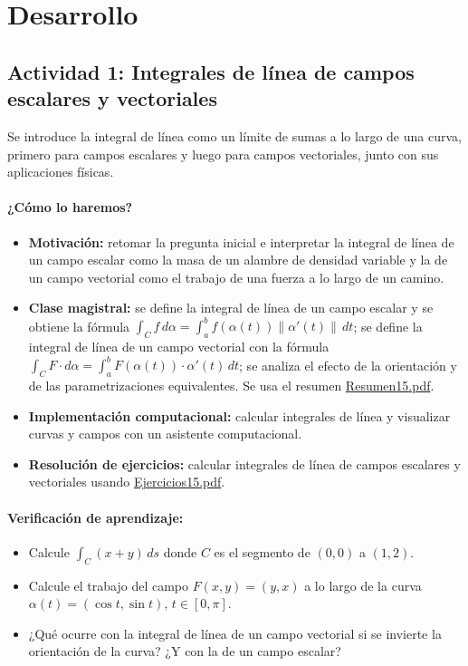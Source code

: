 \documentclass[a4,11pt]{aleph-notas}
\begin{document}
\section*{Desarrollo}

\subsection*{Actividad 1: Integrales de línea de campos escalares y vectoriales}
Se introduce la integral de línea como un límite de sumas a lo largo de una curva, primero para campos escalares y luego para campos vectoriales, junto con sus aplicaciones físicas.

\paragraph{¿Cómo lo haremos?}
\begin{itemize}[leftmargin=*]
    \item \textbf{Motivación:} retomar la pregunta inicial e interpretar la integral de línea de un campo escalar como la masa de un alambre de densidad variable y la de un campo vectorial como el trabajo de una fuerza a lo largo de un camino.
    \item \textbf{Clase magistral:} se define la integral de línea de un campo escalar y se obtiene la fórmula $\int_C f\,d\alpha=\int_a^b f(\alpha(t))\|\alpha'(t)\|\,dt$; se define la integral de línea de un campo vectorial con la fórmula $\int_C F\cdot d\alpha=\int_a^b F(\alpha(t))\cdot\alpha'(t)\,dt$; se analiza el efecto de la orientación y de las parametrizaciones equivalentes. Se usa el resumen \href{https://andres-merino.github.io/MatematicaIII-05-N0051/01Resumen/Resumen15.pdf}{Resumen15.pdf}.
    \item \textbf{Implementación computacional:} calcular integrales de línea y visualizar curvas y campos con un asistente computacional.
    \item \textbf{Resolución de ejercicios:} calcular integrales de línea de campos escalares y vectoriales usando \href{https://andres-merino.github.io/MatematicaIII-05-N0051/04Ejercicios/Ejercicios15.pdf}{Ejercicios15.pdf}.
\end{itemize}

\paragraph{Verificación de aprendizaje:}
\begin{itemize}[leftmargin=*]
    \item Calcule $\int_C (x+y)\,ds$ donde $C$ es el segmento de $(0,0)$ a $(1,2)$.
    \item Calcule el trabajo del campo $F(x,y)=(y,x)$ a lo largo de la curva $\alpha(t)=(\cos t,\sin t)$, $t\in[0,\pi]$.
    \item ¿Qué ocurre con la integral de línea de un campo vectorial si se invierte la orientación de la curva? ¿Y con la de un campo escalar?
\end{itemize}
\end{document}
